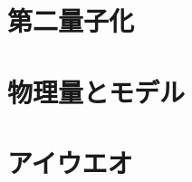 \documentclass[a4j]{jarticle}
\begin{document}
\section{第二量子化}
\section{物理量とモデル}
\section{アイウエオ}
\end{document}
